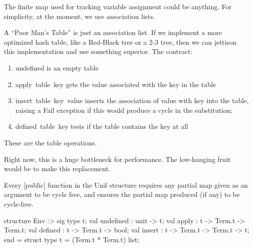 \begin{node}
The finite map used for tracking variable assignment could be
anything. For simplicity, at the moment, we use association lists.

A ``Poor Man's Table'' is just an association list.
If we implement a more optimized hash table, like a Red-Black tree or
a 2-3 tree, then we can jettison this implementation and use something
superior. The contract:
\begin{enumerate}
\item {\Tt{}undefined\nwendquote} is an empty table
\item {\Tt{}apply\ table\ key\nwendquote} gets the value associated with the {\Tt{}key\nwendquote}
  in the {\Tt{}table\nwendquote}
\item {\Tt{}insert\ table\ key\ value\nwendquote} inserts the association of {\Tt{}value\nwendquote}
  with {\Tt{}key\nwendquote} into the {\Tt{}table\nwendquote}, raising a {\Tt{}Fail\nwendquote} exception if
  this would produce a cycle in the substitution;
\item {\Tt{}defined\ table\ key\nwendquote} tests if the {\Tt{}table\nwendquote} contains the
  {\Tt{}key\nwendquote} at all
\end{enumerate}
These are the table operations.

Right now, this is a huge bottleneck for performance. The low-hanging
fruit would be to make this replacement.
\end{node}

\begin{invariant}\label{invariant:unification:cycle-free}
Every [public] function in the {\Tt{}Unif\nwendquote} structure requires any
{\Tt{}\nwendquote} partial map given as an argument to be cycle free, and
ensures the {\Tt{}\nwendquote} partial map produced (if any) to be cycle-free.
\end{invariant}

\nwenddocs{}\endmoddef\nwstartdeflinemarkup{}\nwenddeflinemarkup
structure Env :>
            sig
              type t;
              val undefined : unit -> t;
              val apply : t -> Term.t -> Term.t;
              val defined : t -> Term.t -> bool;
              val insert : t -> Term.t -> Term.t -> t;
            end =
struct
type t = (Term.t * Term.t) list;

